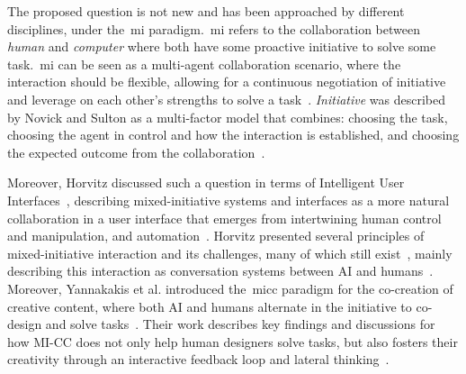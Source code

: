 The proposed question is not new and has been approached by different disciplines, under the~\acrfull{mi} paradigm.~\acrshort{mi} refers to the collaboration between \emph{human} and \emph{computer} where both have some proactive initiative to solve some task.~\acrshort{mi} can be seen as a multi-agent collaboration scenario, where the interaction should be flexible, allowing for a continuous negotiation of initiative and leverage on each other's strengths to solve a task~\cite{allen_mixed-initiative_1999}. \emph{Initiative} was described by Novick and Sulton as a multi-factor model that combines: choosing the task, choosing the agent in control and how the interaction is established, and choosing the expected outcome from the collaboration~\cite{novick_what_1997}. 

Moreover, Horvitz discussed such a question in terms of Intelligent User Interfaces~\cite{birnbaum_compelling_1997}, describing mixed-initiative systems and interfaces as a more natural collaboration in a user interface that emerges from intertwining human control and manipulation, and automation~\cite{horvitz_uncertainty_1999}. Horvitz presented several principles of mixed-initiative interaction and its challenges, many of which still exist~\cite{horvitz_principles_1999}, mainly describing this interaction as conversation systems between AI and humans~\cite{horvitz_computational_1999}. Moreover, Yannakakis et al. introduced the~\acrfull{micc} paradigm for the co-creation of creative content, where both AI and humans alternate in the initiative to co-design and solve tasks~\cite{yannakakis_mixed-initiative_2014}. Their work describes key findings and discussions for how MI-CC does not only help human designers solve tasks, but also fosters their creativity through an interactive feedback loop and lateral thinking~\cite{liapis_can_2016,liapis_computational_2014,alvarez_fostering_2018}.




